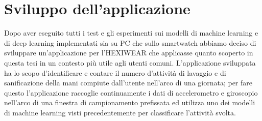 \section{Sviluppo dell'applicazione}
\label{sec:sviluppo-dell-applicazione}

Dopo aver eseguito tutti i test e gli esperimenti sui modelli di machine learning e di deep learning implementati sia su PC che sullo smartwatch abbiamo deciso di sviluppare un'applicazione per l'HEXIWEAR che applicasse quanto scoperto in questa tesi in un contesto più utile agli utenti comuni. L'applicazione sviluppata ha lo scopo d'identificare e contare il numero d'attività di lavaggio e di sanificazione della mani compiute dall'utente nell'arco di una giornata; per fare questo l'applicazione raccoglie continuamente i dati di accelerometro e giroscopio nell'arco di una finestra di campionamento prefissata ed utilizza uno dei modelli di machine learning visti precedentemente per classificare l'attività svolta.


